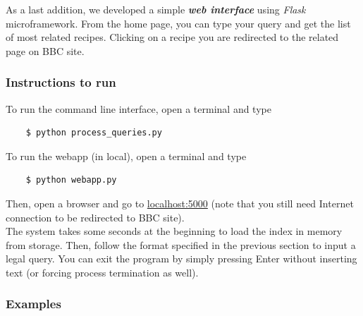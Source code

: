 \medskip

\noindent As a last addition, we developed a simple \textbf{\textit{web interface}} using \textit{Flask}\cite{flask} microframework. From the home page, you can type your query and get the list of most related recipes. Clicking on a recipe you are redirected to the related page on BBC site\cite{bbc}.


\subsubsection{Instructions to run}

To run the command line interface, open a terminal and type
\begin{lstlisting}
	$ python process_queries.py
\end{lstlisting}
To run the webapp (in local), open a terminal and type
\begin{lstlisting}
	$ python webapp.py
\end{lstlisting}
Then, open a browser and go to \url{localhost:5000}  (note that you still need Internet connection to be redirected to BBC site\cite{bbc}).\\
The system takes some seconds at the beginning to load the index in memory from storage. Then, follow the format specified in the previous section to input a legal query. You can exit the program by simply pressing Enter without inserting text (or forcing process termination as well).


\subsubsection{Examples}














